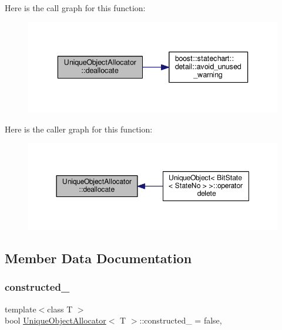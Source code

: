 Here is the call graph for this function\+:
\nopagebreak
\begin{figure}[H]
\begin{center}
\leavevmode
\includegraphics[width=336pt]{class_unique_object_allocator_a56c2cd1285c50ab8ed537aba9493b970_cgraph}
\end{center}
\end{figure}
Here is the caller graph for this function\+:
\nopagebreak
\begin{figure}[H]
\begin{center}
\leavevmode
\includegraphics[width=350pt]{class_unique_object_allocator_a56c2cd1285c50ab8ed537aba9493b970_icgraph}
\end{center}
\end{figure}


\subsection{Member Data Documentation}
\mbox{\label{class_unique_object_allocator_abc28a41fb39ba4adcb23bc21e4121d63}} 
\subsubsection{\texorpdfstring{constructed\+\_\+}{constructed\_}}
{\footnotesize\ttfamily template$<$class T $>$ \\
bool \mbox{\hyperlink{class_unique_object_allocator}{Unique\+Object\+Allocator}}$<$ T $>$\+::constructed\+\_\+ = false\hspace{0.3cm}{\ttfamily [static]}, {\ttfamily [private]}}

